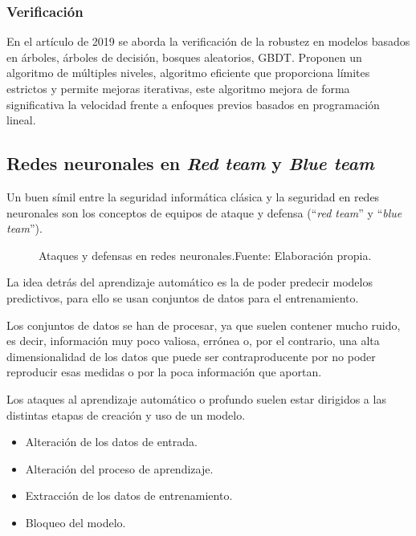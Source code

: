 \subsubsection{Verificación}

En el artículo \cite{chen2019robustness} de 2019 se aborda la verificación de la robustez en modelos basados en árboles, árboles de decisión, bosques aleatorios, \gls{GBDT}. Proponen un algoritmo de múltiples niveles, algoritmo eficiente que proporciona límites estrictos y permite mejoras iterativas, este algoritmo mejora de forma significativa la velocidad frente a enfoques previos basados en programación lineal.



\subsection{Redes neuronales en \textit{Red team} y \textit{Blue team}}

Un buen símil entre la seguridad informática clásica y la seguridad en redes neuronales son los conceptos de equipos de ataque y defensa (``\textit{red team}'' y ``\textit{blue team}'').

\begin{figure}[H]
    \centering
    \centerline{}
    \caption{Ataques y defensas en redes neuronales.\newline{}Fuente: Elaboración propia.}
    \label{fig:art-for-red-and-blue-teams}
\end{figure}

La idea detrás del aprendizaje automático es la de poder predecir modelos predictivos, para ello se usan conjuntos de datos para el entrenamiento.

Los conjuntos de datos se han de procesar, ya que suelen contener mucho ruido, es decir, información muy poco valiosa, errónea o, por el contrario, una alta dimensionalidad de los datos que puede ser contraproducente por no poder reproducir esas medidas o por la poca información que aportan.

Los ataques al aprendizaje automático o profundo suelen estar dirigidos a las distintas etapas de creación y uso de un modelo.

\begin{itemize}
    \item Alteración de los datos de entrada.
    \item Alteración del proceso de aprendizaje.
    \item Extracción de los datos de entrenamiento.
    \item Bloqueo del modelo.
\end{itemize}

